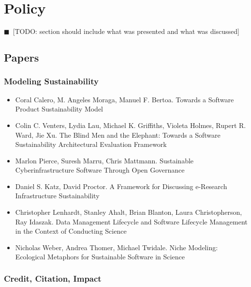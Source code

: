 \documentclass[11pt, oneside]{amsart}
\newcommand{\todo}[1]{{\color{blue}$\blacksquare$~\textsf{[TODO: #1]}}}
\begin{document}
\section{Policy} \label{sec:policy}

\todo{section should include what was presented and what was discussed}

\subsection{Papers}

\subsubsection*{Modeling Sustainability}

\begin{itemize}

\item Coral Calero, M. Angeles Moraga, Manuel F. Bertoa. Towards a
  Software Product Sustainability Model \cite{Calero_WSSSPE}

\item Colin C. Venters, Lydia Lau, Michael K. Griffiths, Violeta
  Holmes, Rupert R. Ward, Jie Xu. The Blind Men and the Elephant:
  Towards a Software Sustainability Architectural Evaluation Framework
  \cite{Venters_WSSSPE}

\item Marlon Pierce, Suresh Marru, Chris Mattmann. Sustainable
  Cyberinfrastructure Software Through Open Governance
  \cite{Pierce_WSSSPE}

\item Daniel S. Katz, David Proctor. A Framework for Discussing
  e-Research Infrastructure Sustainability \cite{Katz_WSSSPE}

\item Christopher Lenhardt, Stanley Ahalt, Brian Blanton, Laura
  Christopherson, Ray Idaszak. Data Management Lifecycle and Software
  Lifecycle Management in the Context of Conducting Science
  \cite{Lenhardt_WSSSPE}

\item Nicholas Weber, Andrea Thomer, Michael Twidale. Niche Modeling:
  Ecological Metaphors for Sustainable Software in Science
  \cite{Weber_WSSSPE}

\end{itemize}

\subsubsection*{Credit, Citation, Impact}
\end{document}
